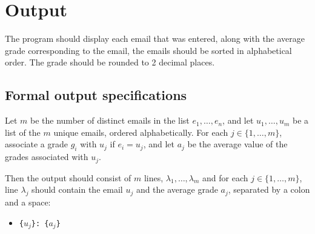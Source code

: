 \section*{Output}

The program should display each email that was entered,
along with the average grade corresponding to the email,
the emails should be sorted in alphabetical order.
The grade should be rounded to 2 decimal places.

\subsection*{Formal output specifications}
Let $m$ be the number of distinct emails in the list
$e_1, \dots, e_n$,
and let $u_1, \dots, u_m$
be a list of the $m$ unique emails, ordered alphabetically.
For each $j \in \{1, \dots, m\}$,
associate a grade $g_i$ with $u_j$ if $e_i = u_j$,
and let $a_j$ be the average value of the grades associated with $u_j$.

Then the output should consist of $m$ lines,
$\lambda_1, \dots, \lambda_m$
and for each $j \in \{1, \dots, m\}$,
line $\lambda_j$ should contain
the email $u_j$ and the average grade $a_j$,
separated by a colon and a space:
\begin{itemize}
    \item
    \texttt{\{$u_j$\}: \{$a_j$\}}
\end{itemize}

